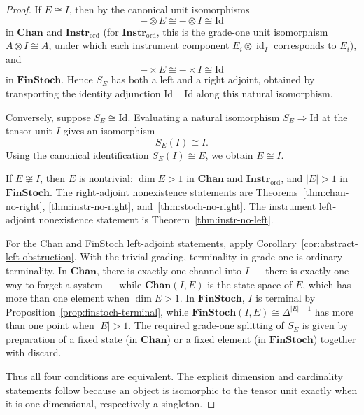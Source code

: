 \documentclass[11pt]{article}
\DeclareMathOperator{\id}{id}
\begin{document}
\begin{proof}
If $E\cong I$, then by the canonical unit isomorphisms
\[
-\otimes E\cong-\otimes I\cong\mathrm{Id}
\]
in $\mathbf{Chan}$ and $\mathbf{Instr}_{\mathrm{ord}}$ (for
$\mathbf{Instr}_{\mathrm{ord}}$, this is the grade-one unit isomorphism
$A\otimes I\cong A$, under which each instrument component
$E_i\otimes\id_I$ corresponds to $E_i$), and
\[
-\times E\cong-\times I\cong\mathrm{Id}
\]
in $\mathbf{FinStoch}$. Hence $S_E$ has both a left and a right adjoint,
obtained by transporting the identity adjunction
$\mathrm{Id}\dashv\mathrm{Id}$ along this natural isomorphism.

Conversely, suppose $S_E\cong\mathrm{Id}$. Evaluating a natural isomorphism
$S_E\Rightarrow\mathrm{Id}$ at the tensor unit $I$ gives an isomorphism
\[
S_E(I)\cong I.
\]
Using the canonical identification $S_E(I)\cong E$, we obtain $E\cong I$.

If $E\not\cong I$, then $E$ is nontrivial: $\dim E>1$ in
$\mathbf{Chan}$ and $\mathbf{Instr}_{\mathrm{ord}}$, and $|E|>1$ in
$\mathbf{FinStoch}$. The right-adjoint nonexistence statements are
Theorems~\ref{thm:chan-no-right}, \ref{thm:instr-no-right},
and~\ref{thm:stoch-no-right}. The instrument left-adjoint nonexistence
statement is Theorem~\ref{thm:instr-no-left}.

For the Chan and FinStoch left-adjoint statements, apply
Corollary~\ref{cor:abstract-left-obstruction}. With the trivial grading,
terminality in grade one is ordinary terminality. In $\mathbf{Chan}$, there
is exactly one channel into $I$ --- there is exactly one way to forget a
system --- while $\mathbf{Chan}(I,E)$ is the state space of $E$, which has
more than one element when $\dim E>1$. In $\mathbf{FinStoch}$, $I$ is
terminal by Proposition~\ref{prop:finstoch-terminal}, while
$\mathbf{FinStoch}(I,E)\cong\Delta^{|E|-1}$ has more than one point when
$|E|>1$. The required grade-one splitting of $S_E$ is given by preparation
of a fixed state (in $\mathbf{Chan}$) or a fixed element (in
$\mathbf{FinStoch}$) together with discard.

Thus all four conditions are equivalent. The explicit dimension and
cardinality statements follow because an object is isomorphic to the tensor
unit exactly when it is one-dimensional, respectively a singleton.
\end{proof}
\end{document}

